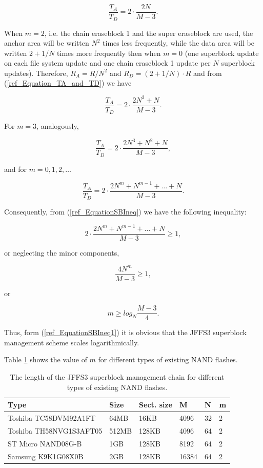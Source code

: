\documentclass[12pt,a4paper,oneside,titlepage]{article}
\begin{document}
$$
\frac{T_A}{T_D} = 2 \cdot \frac{2N}{M-3}.
$$

When $m = 2$, i.e. the chain eraseblock 1 and the super eraseblock are used,
the anchor area will be written $N^2$ times less frequently, while the data
area will be written $2+1/N$ times more frequently then when $m = 0$ (one
superblock update on each file system update and one chain eraseblock 1 update
per $N$ superblock updates). Therefore, $R_A=R/N^2$ and $R_D = (2 + 1/N) \cdot
R$ and from (\ref{ref_Equation_TA_and_TD}) we have

$$
\frac{T_A}{T_D} = 2 \cdot \frac{2N^2+N}{M-3}.
$$

For $m = 3$, analogously,

$$
\frac{T_A}{T_D} = 2 \cdot \frac{2N^3 + N^2 + N}{M-3},
$$

and for $m = 0,1,2,\ldots$

$$
\frac{T_A}{T_D} = 2 \cdot \frac{2N^m + N^{m-1} + \ldots + N}{M-3}.
\label{ref_Equation_TA_div_TD}
$$

Consequently, from (\ref{ref_EquationSBIneq}) we have the following inequality:

$$
2 \cdot \frac{2N^m + N^{m-1} + \ldots + N}{M-3} \geqslant 1,
$$

or neglecting the minor components,

$$
\frac{4N^m}{M-3} \geqslant 1,
$$

or

\begin{equation}
m \geqslant log_N{\frac{M-3}{4}}.
\label{ref_EquationSBIneq1}
\end{equation}

Thus, form (\ref{ref_EquationSBIneq1}) it is obvious that the JFFS3 superblock
management scheme scales logarithmically.

Table \ref{ref_TableNANDLevels} shows the value of $m$ for different types of
existing NAND flashes.

\begin{table}[h]
\begin{center}
\begin{tabular}{llllll}
\textbf{Type} & \textbf{Size} & \textbf{Sect. size} & $\bf M$ & $\bf N$ &
\textbf{$\bf m$}\\
\hline
Toshiba TC58DVM92A1FT   & 64MB  & 16KB  & 4096  & 32 & 2\\
Toshiba TH58NVG1S3AFT05 & 512MB & 128KB & 4096  & 64 & 2\\
ST Micro NAND08G-B      & 1GB   & 128KB & 8192  & 64 & 2\\
Samsung K9K1G08X0B      & 2GB   & 128KB & 16384 & 64 & 2\\
\end{tabular}
\caption{The length of the JFFS3 superblock management chain for different
types of existing NAND flashes.}
\label{ref_TableNANDLevels}
\end{center}
\end{table}
\end{document}
